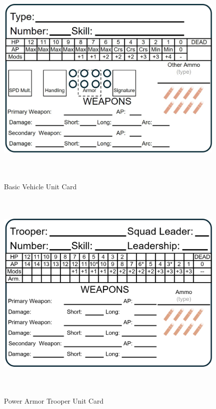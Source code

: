 \begin{figure}[H]
  \centering
  \includegraphics[alt='Sample Vehicle', width=5.63in, height=4in]{img/Vehicle.png}
  \caption*{Basic Vehicle Unit Card}
\end{figure}

\begin{figure}[H]
  \centering
  \includegraphics[alt='Sample Power Armor Trooper', width=5.63in, height=4in]{img/PowerArmorTrooper.png}
  \caption*{Power Armor Trooper Unit Card}
\end{figure}

